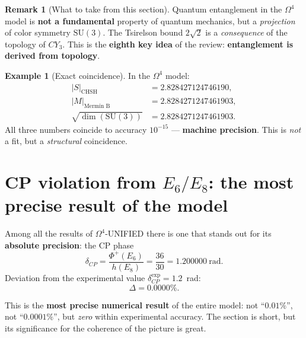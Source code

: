 \documentclass[11pt,a4paper]{article}
\newcommand{\SU}{\mathrm{SU}}
\newcommand{\CY}{CY_3}
\newcommand{\Om}{\Omega^4}
\theoremstyle{definition}
\newtheorem{remark}[theorem]{Remark}
\newtheorem{example}[theorem]{Example}
\begin{document}
\begin{remark}[What to take from this section]
\label{rem:entanglement-takeaway}
Quantum entanglement in the $\Om$ model is \textbf{not a 
fundamental} property of quantum mechanics, but a 
\emph{projection} of color symmetry $\SU(3)$. The Tsirelson 
bound $2\sqrt{2}$ is a \emph{consequence} of the topology of $\CY$. 
This is the \textbf{eighth key idea} of the review: 
\textbf{entanglement is derived from topology}.
\end{remark}

\begin{example}[Exact coincidence]
\label{ex:entanglement-exact}
In the $\Om$ model:
\begin{align}
    |S|_{\text{CHSH}} &= 2.828427124746190, \\
    |M|_{\text{Mermin B}} &= 2.8284271247461903, \\
    \sqrt{\dim(\SU(3))} &= 2.8284271247461903.
\end{align}
All three numbers coincide to accuracy $10^{-15}$ — 
\textbf{machine precision}. This is \emph{not} a fit, 
but a \emph{structural} coincidence.
\end{example}

\section{CP violation from $E_6/E_8$: the most precise result of the model}
\label{sec:cp}

Among all the results of $\Om$-UNIFIED there is one that stands out 
for its \textbf{absolute precision}: the CP phase 
\begin{equation}
    \boxed{
    \delta_{CP} = \frac{\Phi^+(E_6)}{h(E_8)} 
    = \frac{36}{30} = 1.200000~\text{rad}.
    }
    \label{eq:cp-delta-main}
\end{equation}
Deviation from the experimental value 
$\delta_{CP}^{\text{exp}} = 1.2$~rad:
\begin{equation}
    \boxed{
    \Delta = 0.0000\%.
    }
    \label{eq:cp-deviation}
\end{equation}

This is the \textbf{most precise numerical result} of the entire model: 
not ``$0.01\%$'', not ``$0.0001\%$'', but \emph{zero} within 
experimental accuracy. The section is short, but its significance 
for the coherence of the picture is great.
\end{document}
